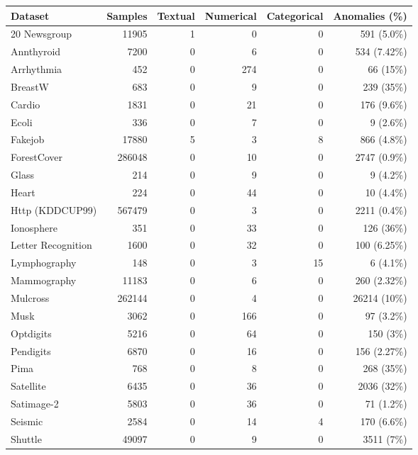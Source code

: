 \begin{table}[t]
\begin{tabular}{lrrrrr}
\toprule
\textbf{Dataset} & \textbf{Samples} & \textbf{Textual} & \textbf{Numerical} & \textbf{Categorical} & \textbf{Anomalies (\%)} \\
\midrule
20 Newsgroup      & 11905 & 1 & 0  & 0  & 591 (5.0\%)   \\
Annthyroid        & 7200   & 0 & 6   & 0 & 534 (7.42\%) \\
Arrhythmia        & 452    & 0 & 274 & 0 & 66 (15\%)    \\
BreastW           & 683    & 0 & 9   & 0 & 239 (35\%)   \\
Cardio            & 1831   & 0 & 21  & 0 & 176 (9.6\%)  \\
Ecoli             & 336    & 0 & 7   & 0 & 9 (2.6\%)    \\
Fakejob   & 17880  & 5 & 3   & 8  & 866 (4.8\%)  \\
ForestCover       & 286048 & 0 & 10  & 0 & 2747 (0.9\%) \\
Glass             & 214    & 0 & 9   & 0 & 9 (4.2\%)    \\
Heart             & 224    & 0 & 44  & 0 & 10 (4.4\%)   \\
Http (KDDCUP99)   & 567479 & 0 & 3   & 0 & 2211 (0.4\%) \\
Ionosphere        & 351    & 0 & 33  & 0 & 126 (36\%)   \\
Letter Recognition& 1600   & 0 & 32  & 0 & 100 (6.25\%) \\
Lymphography      & 148    & 0 & 3   & 15 & 6 (4.1\%)    \\
Mammography       & 11183  & 0 & 6   & 0 & 260 (2.32\%) \\
Mulcross          & 262144 & 0 & 4   & 0 & 26214 (10\%) \\
Musk              & 3062   & 0 & 166 & 0 & 97 (3.2\%)   \\
Optdigits         & 5216   & 0 & 64  & 0 & 150 (3\%)    \\
Pendigits         & 6870   & 0 & 16  & 0 & 156 (2.27\%) \\
Pima              & 768    & 0 & 8   & 0 & 268 (35\%)   \\
Satellite         & 6435   & 0 & 36  & 0 & 2036 (32\%)  \\
Satimage-2        & 5803   & 0 & 36  & 0 & 71 (1.2\%)   \\
Seismic           & 2584   & 0 & 14  & 4  & 170 (6.6\%)  \\
Shuttle           & 49097  & 0 & 9   & 0 & 3511 (7\%)   \\

\end{tabular}
\end{table}
